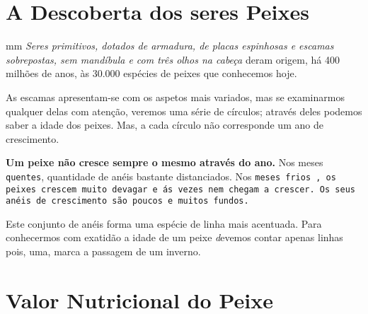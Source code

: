 \documentclass[a4paper, 11pt]{article}
\begin{document}
	\section{A Descoberta dos seres Peixes}
		{ mm }
		\textit{Seres primitivos, dotados de armadura, de placas espinhosas e escamas sobrepostas,
		sem mandíbula e com três olhos na cabeça}
		deram origem, há
		{\LARGE 400 milhões}
		de anos, às 30.000 espécies de peixes que conhecemos hoje.

		\vspace{0.5cm}
		{\huge {}} 
		\vspace{0.5cm}


		{\hskip 3mm} As escamas apresentam-se com os aspetos mais variados, mas se examinarmos
		qualquer delas com atenção, veremos uma série de círculos; através deles podemos saber a
		idade dos peixes. Mas, a cada círculo não corresponde um ano de crescimento.

		\textbf {Um peixe não cresce sempre o mesmo através do ano.} Nos meses
		{\tt quentes}, quantidade de anéis bastante distanciados. Nos
		\tt{meses frios} , os peixes crescem muito devagar e ás vezes nem chegam a crescer.
		Os seus anéis de crescimento são poucos e muitos fundos.

		Este conjunto de anéis forma uma espécie de linha mais acentuada. Para
		conhecermos com exatidão a idade de um peixe 
		{\emph devemos contar apenas linhas}
		pois, uma, marca a passagem de um {\huge inverno}.
	\section{Valor Nutricional do Peixe}
\end{document}
